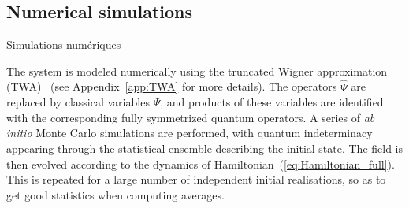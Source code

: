 \documentclass[aps,prd,notitlepage,amsfonts,amssymb,amsmath,nofootinbib,superscriptaddress,longbibliography]{revtex4-2}
\newcommand{\trad}[1]{\textcolor{tradcolor}{#1}}
\begin{document}
\subsection{Numerical simulations}
\label{subsec:Numerical_simulations}
\trad{Simulations numériques}

The system is modeled numerically using the truncated Wigner approximation (TWA)~\cite{steelDynamicalQuantumNoise1998} (see Appendix~\ref{app:TWA} for more details). The operators $\hat{\Psi}$ are replaced by classical variables $\Psi$, and products of these variables are identified with the corresponding fully symmetrized quantum operators.  A series of {\it ab initio} Monte Carlo simulations are performed, with quantum indeterminacy appearing through the statistical ensemble describing the initial state.  The field is then evolved according to the dynamics of Hamiltonian~(\ref{eq:Hamiltonian_full}). This is repeated for a large number of independent initial realisations, so as to get good statistics when computing averages.
\end{document}
